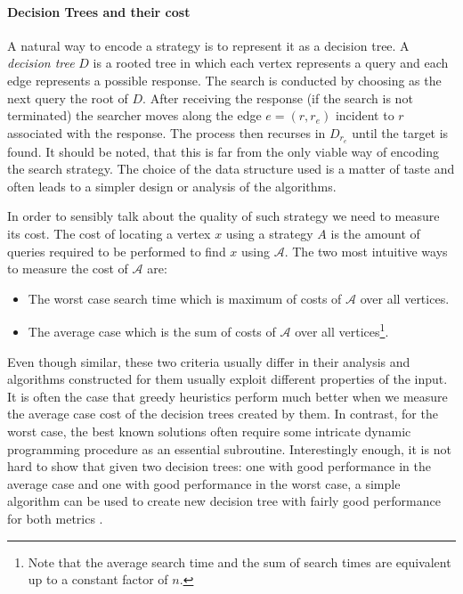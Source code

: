 
% 

\paragraph{Decision Trees and their cost}
A natural way to encode a strategy is to represent it as a decision tree. A \textit{decision tree} $D$ is a rooted tree in which each vertex represents a query and each edge represents a possible response. The search is conducted by choosing as the next query the root of $D$. After receiving the response (if the search is not terminated) the searcher moves along the edge $e=(r, r_e)$ incident to $r$ associated with the response. The process then recurses in $D_{r_e}$ until the target is found. It should be noted, that this is far from the only viable way of encoding the search strategy. The choice of the data structure used is a matter of taste and often leads to a simpler design or analysis of the algorithms.

In order to sensibly talk about the quality of such strategy we need to measure its cost. The cost of locating a vertex $x$ using a strategy $A$ is the amount of queries required to be performed to find $x$ using $\mathcal{A}$. The two most intuitive ways to measure the cost of $\mathcal{A}$ are: 
\begin{itemize}
    \item The worst case search time which is maximum of costs of $\mathcal{A}$ over all vertices.
    \item The average case which is the sum of costs of $\mathcal{A}$ over all vertices\footnote{Note that the average search time and the sum of search times are equivalent up to a constant factor of $n$.}.
\end{itemize}

Even though similar, these two criteria usually differ in their analysis and algorithms constructed for them usually exploit different properties of the input. It is often the case that greedy heuristics perform much better when we measure the average case cost of the decision trees created by them. In contrast, for the worst case, the best known solutions often require some intricate dynamic programming procedure as an essential subroutine. Interestingly enough, it is not hard to show that given two decision trees: one with good performance in the average case and one with good performance in the worst case, a simple algorithm can be used to create new decision tree with fairly good performance for both metrics \cite{Tradingoff}.

